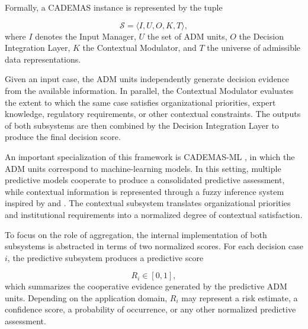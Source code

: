 \documentclass[mathematics,article,submit,moreauthors]{Definitions/mdpi}
\begin{document}
Formally, a CADEMAS instance is represented by the tuple

\begin{equation}
\mathcal{S}=
\langle I,U,O,K,T\rangle,
\end{equation}
where $I$ denotes the Input Manager, $U$ the set of ADM units,
$O$ the Decision Integration Layer, $K$ the Contextual Modulator, and
$T$ the universe of admissible data representations.

Given an input case, the ADM units independently generate decision
evidence from the available information. In parallel, the Contextual
Modulator evaluates the extent to which the same case satisfies
organizational priorities, expert knowledge, regulatory requirements,
or other contextual constraints. The outputs of both subsystems are then
combined by the Decision Integration Layer to produce the final
decision score.


An important specialization of this framework is CADEMAS-ML
\citep{Godz2026}, in which the ADM units correspond to machine-learning
models. In this setting, multiple predictive models cooperate to produce
a consolidated predictive assessment, while contextual information is
represented through a fuzzy inference system inspired by
\citet{PerezCanedo2022} and \citet{PerezCanedo2024}. The contextual
subsystem translates organizational priorities and institutional
requirements into a normalized degree of contextual satisfaction.

To focus on the role of aggregation, the internal implementation of both
subsystems is abstracted in terms of two normalized scores. For each
decision case $i$, the predictive subsystem produces a predictive score

\begin{equation}
R_i \in [0,1],
\end{equation}
which summarizes the cooperative evidence generated by the predictive
ADM units. Depending on the application domain, $R_i$ may represent a
risk estimate, a confidence score, a probability of occurrence, or any
other normalized predictive assessment.
\end{document}
